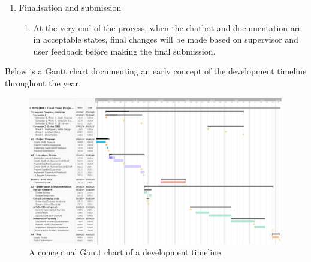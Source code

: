 \documentclass[12pt]{report}
\begin{document}
\begin{enumerate}
        \item Finalisation and submission
        \begin{enumerate}
            \item At the very end of the process, when the chatbot and documentation are in acceptable states,
            final changes will be made based on supervisor and user feedback before making the final submission.
        \end{enumerate}
    \end{enumerate}

    \vspace{0.5cm}
    \noindent Below is a Gantt chart documenting an early concept of the development timeline throughout the year.

    \pagebreak

    \begin{landscape}

    \begin{figure}[H]
        \centering
        \includegraphics[width=.9\linewidth]{ProposalGantt.png}
        \caption{A conceptual Gantt chart of a development timeline.}
        \label{fig:gantt}
    \end{figure}

    \end{landscape}
\end{document}

